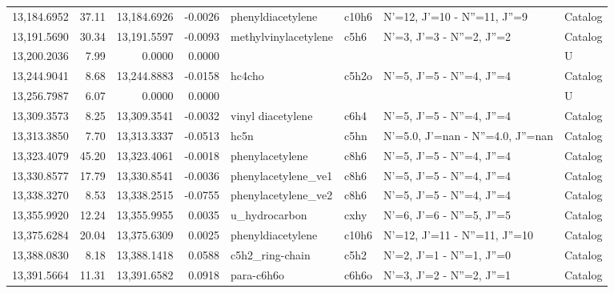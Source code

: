 \begin{longtable}{rrrrllll}
13,184.6952 &     37.11 &       13,184.6926 &   -0.0026 &           phenyldiacetylene &   c10h6 &         N'=12, J'=10 - N''=11, J''=9 &    Catalog \\
13,191.5690 &     30.34 &       13,191.5597 &   -0.0093 &        methylvinylacetylene &    c5h6 &            N'=3, J'=3 - N''=2, J''=2 &    Catalog \\
13,200.2036 &      7.99 &            0.0000 &    0.0000 &                             &         &                                      &          U \\
13,244.9041 &      8.68 &       13,244.8883 &   -0.0158 &                      hc4cho &   c5h2o &            N'=5, J'=5 - N''=4, J''=4 &    Catalog \\
13,256.7987 &      6.07 &            0.0000 &    0.0000 &                             &         &                                      &          U \\
13,309.3573 &      8.25 &       13,309.3541 &   -0.0032 &           vinyl diacetylene &    c6h4 &            N'=5, J'=5 - N''=4, J''=4 &    Catalog \\
13,313.3850 &      7.70 &       13,313.3337 &   -0.0513 &                        hc5n &    c5hn &    N'=5.0, J'=nan - N''=4.0, J''=nan &    Catalog \\
13,323.4079 &     45.20 &       13,323.4061 &   -0.0018 &             phenylacetylene &    c8h6 &            N'=5, J'=5 - N''=4, J''=4 &    Catalog \\
13,330.8577 &     17.79 &       13,330.8541 &   -0.0036 &         phenylacetylene_ve1 &    c8h6 &            N'=5, J'=5 - N''=4, J''=4 &    Catalog \\
13,338.3270 &      8.53 &       13,338.2515 &   -0.0755 &         phenylacetylene_ve2 &    c8h6 &            N'=5, J'=5 - N''=4, J''=4 &    Catalog \\
13,355.9920 &     12.24 &       13,355.9955 &    0.0035 &               u_hydrocarbon &    cxhy &            N'=6, J'=6 - N''=5, J''=5 &    Catalog \\
13,375.6284 &     20.04 &       13,375.6309 &    0.0025 &           phenyldiacetylene &   c10h6 &        N'=12, J'=11 - N''=11, J''=10 &    Catalog \\
13,388.0830 &      8.18 &       13,388.1418 &    0.0588 &             c5h2_ring-chain &    c5h2 &            N'=2, J'=1 - N''=1, J''=0 &    Catalog \\
13,391.5664 &     11.31 &       13,391.6582 &    0.0918 &                  para-c6h6o &   c6h6o &            N'=3, J'=2 - N''=2, J''=1 &    Catalog \\

\end{longtable}
